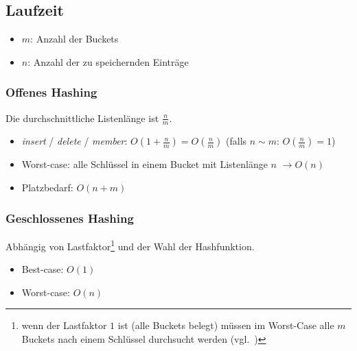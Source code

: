\subsection{Laufzeit}

\begin{itemize}
    \item $m$: Anzahl der Buckets
    \item $n$: Anzahl der zu speichernden Einträge
\end{itemize}

\subsubsection{Offenes Hashing}

\noindent
Die durchschnittliche Listenlänge ist $\frac{n}{m}$.

\begin{itemize}
    \item \textit{insert} / \textit{delete} / \textit{member}: $O(1 + \frac{n}{m}) = O(\frac{n}{m})$ (falls $n \sim m$: $O(\frac{n}{m}) = 1$)
    \item Worst-case: alle Schlüssel in einem Bucket mit Listenlänge $n$ $\rightarrow O(n)$
    \item Platzbedarf: $O(n + m)$
\end{itemize}

\subsubsection{Geschlossenes Hashing}

Abhängig von Lastfaktor\footnote{wenn der Lastfaktor $1$ ist (alle Buckets belegt) müssen im Worst-Case alle $m$ Buckets nach einem Schlüssel durchsucht werden (vgl.~\cite[300]{CL22})} und der Wahl der Hashfunktion.

\begin{itemize}
    \item Best-case: $O(1)$
    \item Worst-case: $O(n)$
\end{itemize}